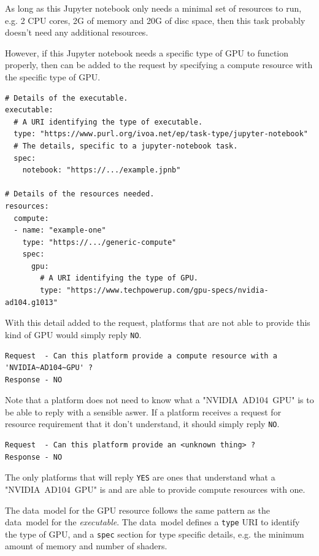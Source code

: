 \documentclass[11pt,a4paper]{ivoa}
\newcommand{\datamodel} {data~model}
\newcommand{\jupyternotebook} {Jupyter notebook}
\newcommand{\codeword}[1] {\texttt{#1}}
\newcommand{\executable} {\textit{executable}}
\newcommand{\cpu} {CPU}
\newcommand{\gpu} {GPU}
\newcommand{\nvidiagpu} {NVIDIA~AD104~GPU}
\begin{document}
As long as this \jupyternotebook{} only needs a minimal set of resources to run, e.g.
2 \cpu{} cores, 2G of memory and 20G of disc space, then this task probably doesn't need
any additional resources.

However, if this \jupyternotebook{} needs a specific type of \gpu{} to function properly,
then can be added to the request by specifying a compute resource with the specific type
of \gpu{}.

\begin{lstlisting}[]
# Details of the executable.
executable:
  # A URI identifying the type of executable.
  type: "https://www.purl.org/ivoa.net/ep/task-type/jupyter-notebook"
  # The details, specific to a jupyter-notebook task.
  spec:
    notebook: "https://.../example.jpnb"

# Details of the resources needed.
resources:
  compute:
  - name: "example-one"
    type: "https://.../generic-compute"
    spec:
      gpu:
        # A URI identifying the type of GPU.
        type: "https://www.techpowerup.com/gpu-specs/nvidia-ad104.g1013"
\end{lstlisting}

With this detail added to the request, platforms that are not able to provide this kind of \gpu{}
would simply reply \codeword{NO}.

\begin{lstlisting}[]
Request  - Can this platform provide a compute resource with a 'NVIDIA~AD104~GPU' ?
Response - NO
\end{lstlisting}

Note that a platform does not need to know what a  "\nvidiagpu{}" is to be able to reply with a sensible aswer.
If a platform receives a request for resource requirement that it don't understand, it should simply reply \codeword{NO}.

\begin{lstlisting}[]
Request  - Can this platform provide an <unknown thing> ?
Response - NO
\end{lstlisting}

The only platforms that will reply \codeword{YES} are ones that understand what a "\nvidiagpu{}"
is and are able to provide compute resources with one.

The \datamodel{} for the \gpu{} resource follows the same pattern as the \datamodel{} for
the \executable{}. The \datamodel{} defines a \codeword{type} URI to identify the type of \gpu{},
and a \codeword{spec} section for type specific details,
e.g. the minimum amount of memory and number of shaders.
\end{document}
